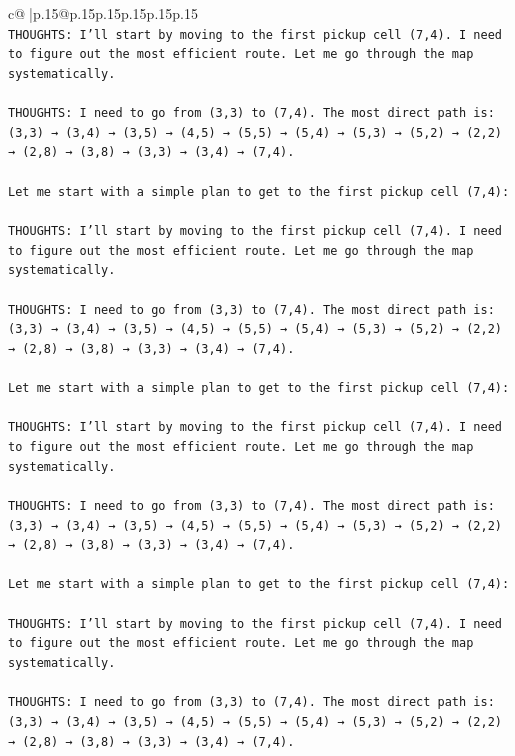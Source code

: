 \documentclass{article}
\begin{document}
{\begin{supertabular}{c@{$\;$}|p{.15\linewidth}@{}p{.15\linewidth}p{.15\linewidth}p{.15\linewidth}p{.15\linewidth}p{.15\linewidth}}
{{{\\ 
\texttt{THOUGHTS: I'll start by moving to the first pickup cell (7,4). I need to figure out the most efficient route. Let me go through the map systematically.} \\
\\ 
\texttt{THOUGHTS: I need to go from (3,3) to (7,4). The most direct path is: (3,3) → (3,4) → (3,5) → (4,5) → (5,5) → (5,4) → (5,3) → (5,2) → (2,2) → (2,8) → (3,8) → (3,3) → (3,4) → (7,4).} \\
\\ 
\texttt{Let me start with a simple plan to get to the first pickup cell (7,4):} \\
\\ 
\texttt{THOUGHTS: I'll start by moving to the first pickup cell (7,4). I need to figure out the most efficient route. Let me go through the map systematically.} \\
\\ 
\texttt{THOUGHTS: I need to go from (3,3) to (7,4). The most direct path is: (3,3) → (3,4) → (3,5) → (4,5) → (5,5) → (5,4) → (5,3) → (5,2) → (2,2) → (2,8) → (3,8) → (3,3) → (3,4) → (7,4).} \\
\\ 
\texttt{Let me start with a simple plan to get to the first pickup cell (7,4):} \\
\\ 
\texttt{THOUGHTS: I'll start by moving to the first pickup cell (7,4). I need to figure out the most efficient route. Let me go through the map systematically.} \\
\\ 
\texttt{THOUGHTS: I need to go from (3,3) to (7,4). The most direct path is: (3,3) → (3,4) → (3,5) → (4,5) → (5,5) → (5,4) → (5,3) → (5,2) → (2,2) → (2,8) → (3,8) → (3,3) → (3,4) → (7,4).} \\
\\ 
\texttt{Let me start with a simple plan to get to the first pickup cell (7,4):} \\
\\ 
\texttt{THOUGHTS: I'll start by moving to the first pickup cell (7,4). I need to figure out the most efficient route. Let me go through the map systematically.} \\
\\ 
\texttt{THOUGHTS: I need to go from (3,3) to (7,4). The most direct path is: (3,3) → (3,4) → (3,5) → (4,5) → (5,5) → (5,4) → (5,3) → (5,2) → (2,2) → (2,8) → (3,8) → (3,3) → (3,4) → (7,4).} \\
\\ 
}}}
\end{supertabular}}
\end{document}
